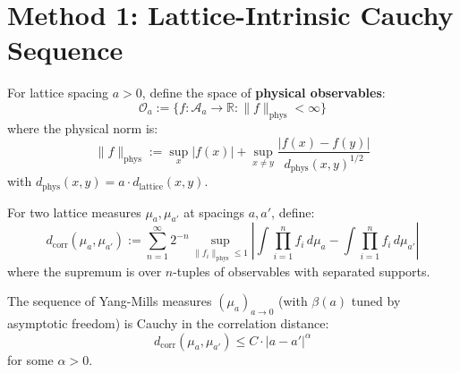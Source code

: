 \section{Method 1: Lattice-Intrinsic Cauchy Sequence}
\label{subsec:lattice-cauchy}

\begin{definition}
\label{def:scaled-observables}
For lattice spacing $a > 0$, define the space of \textbf{physical observables}:
\begin{equation}
\mathcal{O}_a := \{f: \mathcal{A}_a \to \mathbb{R} : \|f\|_{\text{phys}} < \infty\}
\end{equation}
where the physical norm is:
\begin{equation}
\|f\|_{\text{phys}} := \sup_x |f(x)| + \sup_{x \neq y} \frac{|f(x) - f(y)|}{d_{\text{phys}}(x,y)^{1/2}}
\end{equation}
with $d_{\text{phys}}(x, y) = a \cdot d_{\text{lattice}}(x, y)$.
\end{definition}

\begin{definition}
\label{def:correlation-distance}
For two lattice measures $\mu_a, \mu_{a'}$ at spacings $a, a'$, define:
\begin{equation}
d_{\text{corr}}(\mu_a, \mu_{a'}) := \sum_{n=1}^\infty 2^{-n} \sup_{\|f_i\|_{\text{phys}} \leq 1} 
\left| \int \prod_{i=1}^n f_i \, d\mu_a - \int \prod_{i=1}^n f_i \, d\mu_{a'} \right|
\end{equation}
where the supremum is over $n$-tuples of observables with separated supports.
\end{definition}

\begin{theorem}
\label{thm:cauchy-lattice}
The sequence of Yang-Mills measures $(\mu_a)_{a \to 0}$ (with $\beta(a)$ 
tuned by asymptotic freedom) is Cauchy in the correlation distance:
\begin{equation}
d_{\text{corr}}(\mu_a, \mu_{a'}) \leq C \cdot |a - a'|^{\alpha}
\end{equation}
for some $\alpha > 0$.
\end{theorem}


